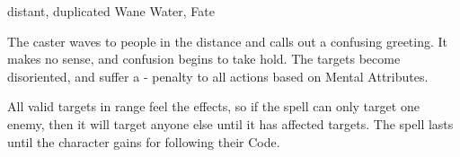   {distant, duplicated}%
  {Wane}%
  {Water, Fate}%
  {}%
  {
    The caster waves to people in the distance and calls out a confusing greeting.
    It makes no sense, and confusion begins to take hold.
    The targets become disoriented, and suffer a - penalty to all actions based on Mental Attributes.

    All valid targets in range feel the effects, so if the spell can only target one enemy, then it will target anyone else until it has affected  targets.
    The spell lasts until the character gains  for following their Code.
  }%
  {}
